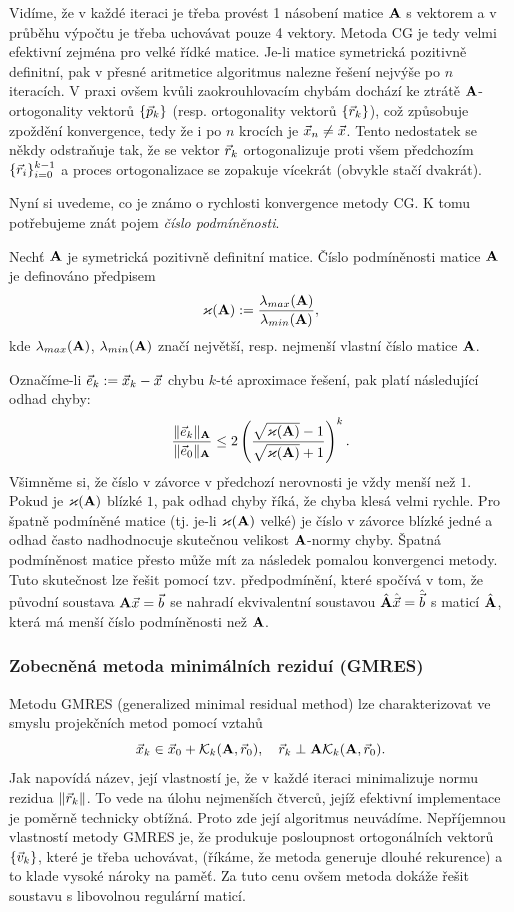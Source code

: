 Vidíme, že v každé iteraci je třeba provést 1 násobení matice $\mathbf{A}$ s vektorem a v průběhu výpočtu je třeba uchovávat pouze 4 vektory.
Metoda CG je tedy velmi efektivní zejména pro velké řídké matice.
Je-li matice symetrická pozitivně definitní, pak v přesné aritmetice algoritmus nalezne řešení nejvýše po $n$ iteracích.
V praxi ovšem kvůli zaokrouhlovacím chybám dochází ke ztrátě $\mathbf{A}$-ortogonality vektorů $\{\vec{p}_k\}$ (resp. ortogonality vektorů $\{\vec{r}_k\}$), což způsobuje zpoždění konvergence, tedy že i po $n$ krocích je $\vec{x}_n\neq\vec{x}$.
Tento nedostatek se někdy odstraňuje tak, že se vektor $\vec{r}_k$ ortogonalizuje proti všem předchozím $\{\vec{r}_i\}_{i=0}^{k-1}$ a proces ortogonalizace se zopakuje vícekrát (obvykle stačí dvakrát).

Nyní si uvedeme, co je známo o rychlosti konvergence metody CG.
K tomu potřebujeme znát pojem \emph{číslo podmíněnosti}.
\begin{df}
Nechť $\mathbf{A}$ je symetrická pozitivně definitní matice.
Číslo podmíněnosti matice $\mathbf{A}$ je definováno předpisem
$$ \varkappa(\mathbf{A}):=\frac{\lambda_{max}(\mathbf{A})}{\lambda_{min}(\mathbf{A})}, $$
kde $\lambda_{max}(\mathbf{A})$, $\lambda_{min}(\mathbf{A})$ značí největší, resp. nejmenší vlastní číslo matice $\mathbf{A}$.
\end{df}
Označíme-li $\vec{e}_k:=\vec{x}_k-\vec{x}$ chybu $k$-té aproximace řešení, pak platí následující odhad chyby:
$$ \frac{\|\vec{e}_k\|_{\mathbf{A}}}{\|\vec{e}_0\|_{\mathbf{A}}} \le 2\left(\frac{\sqrt{\varkappa(\mathbf{A})}-1}{\sqrt{\varkappa(\mathbf{A})}+1}\right)^k. $$
Všimněme si, že číslo v závorce v předchozí nerovnosti je vždy menší než $1$.
Pokud je $\varkappa(\mathbf{A})$ blízké $1$, pak odhad chyby říká, že chyba klesá velmi rychle.
Pro špatně podmíněné matice (tj. je-li $\varkappa(\mathbf{A})$ velké) je číslo v závorce blízké jedné a odhad často nadhodnocuje skutečnou velikost $\mathbf{A}$-normy chyby.
Špatná podmíněnost matice přesto může mít za následek pomalou konvergenci metody.
Tuto skutečnost lze řešit pomocí tzv. předpodmínění, které spočívá v tom, že původní soustava $\mathbf{A}\vec{x}=\vec{b}$ se nahradí ekvivalentní soustavou $\hat{\mathbf{A}}\hat{\vec{x}}=\hat{\vec{b}}$ s maticí $\hat{\mathbf{A}}$, která má menší číslo podmíněnosti než $\mathbf{A}$.



\subsubsection{Zobecněná metoda minimálních reziduí (GMRES)}

Metodu GMRES (generalized minimal residual method) lze charakterizovat ve smyslu projekčních metod pomocí vztahů
$$ \vec{x}_k\in\vec{x}_0+\mathcal K_k(\mathbf{A},\vec{r}_0),\quad \vec{r}_k\perp\mathbf{A}\mathcal K_k(\mathbf{A},\vec{r}_0). $$
Jak napovídá název, její vlastností je, že v každé iteraci minimalizuje normu rezidua $\|\vec{r}_k\|$.
To vede na úlohu nejmenších čtverců, jejíž efektivní implementace je poměrně technicky obtížná.
Proto zde její algoritmus neuvádíme.
Nepříjemnou vlastností metody GMRES je, že produkuje posloupnost ortogonálních vektorů $\{\vec{v}_k\}$, které je třeba uchovávat, (říkáme, že metoda generuje dlouhé rekurence) a to klade vysoké nároky na paměť.
Za tuto cenu ovšem metoda dokáže řešit soustavu s libovolnou regulární maticí.

